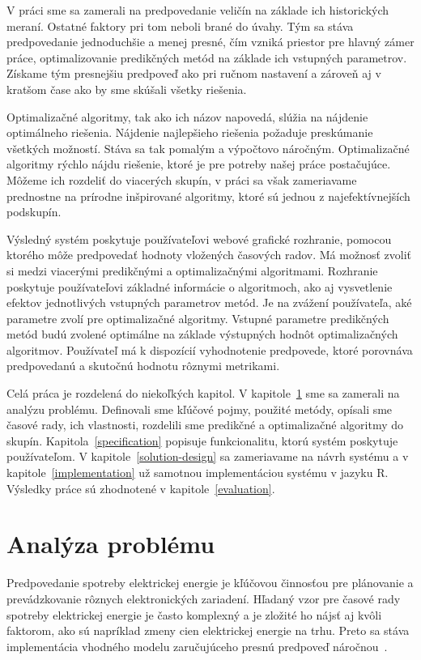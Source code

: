 \documentclass[a4paper,slovak,12pt,appendix]{article}
\begin{document}
V práci sme sa zamerali na predpovedanie veličín na základe ich historických
meraní. Ostatné faktory pri tom neboli brané do úvahy. Tým sa stáva
predpovedanie jednoduchšie a menej presné, čím vzniká priestor pre hlavný zámer
práce, optimalizovanie predikčných metód na základe ich vstupných parametrov.
Získame tým presnejšiu predpoveď ako pri ručnom nastavení a zároveň aj v kratšom
čase ako by sme skúšali všetky riešenia.

Optimalizačné algoritmy, tak ako ich názov napovedá, slúžia na nájdenie
optimálneho riešenia. Nájdenie najlepšieho riešenia požaduje preskúmanie
všetkých možností. Stáva sa tak pomalým a výpočtovo náročným. Optimalizačné
algoritmy rýchlo nájdu riešenie, ktoré je pre potreby našej práce postačujúce.
Môžeme ich rozdeliť do viacerých skupín, v práci sa však
zameriavame prednostne na prírodne inšpirované algoritmy, ktoré sú jednou
z najefektívnejších podskupín.

Výsledný systém poskytuje používateľovi webové grafické rozhranie, pomocou
ktorého môže predpovedať hodnoty vložených časových radov. Má možnosť zvoliť si
medzi viacerými predikčnými a optimalizačnými algoritmami. Rozhranie poskytuje
používateľovi základné informácie o algoritmoch, ako aj vysvetlenie efektov
jednotlivých vstupných parametrov metód. Je na zvážení používateľa, aké
parametre zvolí pre optimalizačné algoritmy. Vstupné parametre predikčných
metód budú zvolené optimálne na základe výstupných hodnôt optimalizačných
algoritmov. Používateľ má k dispozícií vyhodnotenie predpovede, ktoré porovnáva
predpovedanú a skutočnú hodnotu rôznymi metrikami.

Celá práca je rozdelená do niekoľkých kapitol. V
kapitole~\ref{problem-analysis} sme sa zamerali na analýzu problému. Definovali
sme kľúčové pojmy, použité metódy, opísali sme časové rady, ich vlastnosti,
rozdelili sme predikčné a optimalizačné algoritmy do skupín.
Kapitola~\ref{specification} popisuje funkcionalitu, ktorú systém poskytuje
používateľom. V kapitole~\ref{solution-design} sa zameriavame na návrh systému
a v kapitole~\ref{implementation} už samotnou implementáciou systému v jazyku R.
Výsledky práce sú zhodnotené v kapitole~\ref{evaluation}.


\newpage
\section{Analýza problému}
\label{problem-analysis}
Predpovedanie spotreby elektrickej energie je kľúčovou činnosťou pre plánovanie
a prevádzkovanie rôznych elektronických zariadení. Hľadaný vzor pre časové
rady spotreby elektrickej energie je často komplexný a je zložité ho nájsť aj
kvôli faktorom, ako sú napríklad zmeny cien elektrickej energie na trhu. Preto sa
stáva implementácia vhodného modelu zaručujúceho presnú predpoveď
náročnou~\cite{Mahalakshmi2016}.
\end{document}

